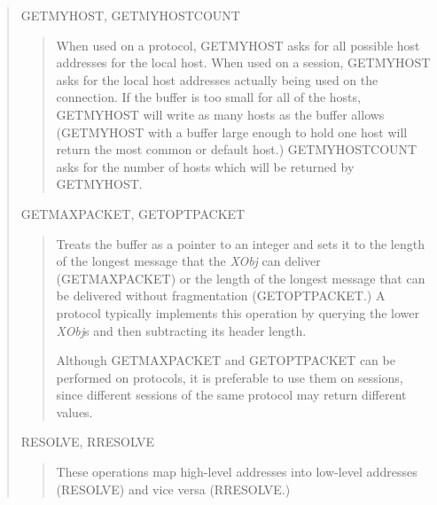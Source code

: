 \begin{quote}
	GETMYHOST, GETMYHOSTCOUNT
\begin{quote}
When used on a protocol, GETMYHOST asks for all possible host
addresses for the local host.  When used on a session, GETMYHOST asks
for the local host addresses actually being used on the connection.
If the buffer is too small for all of the hosts, GETMYHOST will write
as many hosts as the buffer allows (GETMYHOST with a buffer large
enough to hold one host will return the most common or default host.)
GETMYHOSTCOUNT asks for the number of hosts which will be returned by
GETMYHOST.

\end{quote}

	GETMAXPACKET, GETOPTPACKET
\begin{quote}

Treats the buffer as a pointer to an integer and sets it to the length
of the longest message that the {\em XObj} can deliver (GETMAXPACKET) or
the length of the longest message that can be delivered without
fragmentation (GETOPTPACKET.)  A protocol typically implements this
operation by querying the lower {\em XObj}s and then subtracting its
header length.  

\smallskip
Although GETMAXPACKET and GETOPTPACKET can be performed on protocols,
it is preferable to use them on sessions, since different sessions of
the same protocol may return different values.

\end{quote}

	RESOLVE, RRESOLVE
\begin{quote}

These operations map high-level addresses into low-level
addresses (RESOLVE) and vice versa (RRESOLVE.) 

\end{quote}
\end{quote}

\newpage{}

